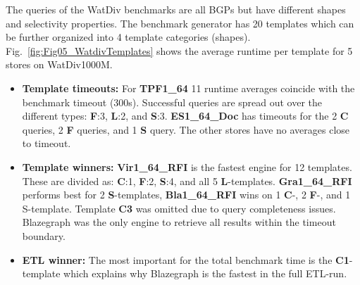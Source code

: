 \documentclass[twocolumn]{bmcart}%
\begin{document}
The queries of the WatDiv benchmarks are all BGPs but have different shapes and selectivity properties. The benchmark generator has 20 templates which can be further organized into 4 template categories (shapes). 
Fig.~\ref{fig:Fig05_WatdivTemplates} shows the average runtime per template for 5 stores on WatDiv1000M.
\begin{itemize}
	\item \textbf{Template timeouts:} For \textbf{TPF1\_64} 11 runtime averages coincide with the benchmark timeout (300s). Successful queries are spread out over the different types: \textbf{F}:3, \textbf{L}:2, and \textbf{S}:3.
	\textbf{ES1\_64\_Doc} has timeouts for the 2 \textbf{C} queries,  2 \textbf{F} queries, and 1 \textbf{S} query. The other stores have no averages close to timeout.
	\item  \textbf{Template winners:} \textbf{Vir1\_64\_RFI} is the fastest engine for 12 templates. These are divided as: \textbf{C}:1, \textbf{F}:2, \textbf{S}:4, and all 5 \textbf{L}-templates.
	\textbf{Gra1\_64\_RFI} performs best for 2 \textbf{S}-templates, \textbf{Bla1\_64\_RFI} wins on 1 \textbf{C}-,  2 \textbf{F}-,  and 1 S-template.
	Template \textbf{C3} was omitted due to query completeness issues. Blazegraph was the only engine to retrieve all results within the timeout boundary.
	\item \textbf{ETL winner:} The most important for the total benchmark time is the \textbf{C1}-template which explains why Blazegraph is the fastest in the full ETL-run.
\end{itemize}
\end{document}
